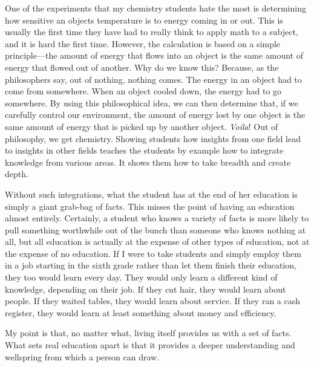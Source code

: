 \documentclass[letterpaper]{article}
\begin{document}
{\color{black}
One of the experiments that my chemistry students hate the most is
determining how sensitive an object{\textquotesingle}s temperature is
to energy coming in or out. This is usually the first time they have
had to really think to apply math to a subject, and it is hard the
first time. However, the calculation is based on a simple principle—the
amount of energy that flows into an object is the same amount of energy
that flowed out of another. Why do we know this? Because, as the
philosophers say, out of nothing, nothing comes. The energy in an
object had to come from somewhere. When an object cooled down, the
energy had to go somewhere. By using this philosophical idea, we can
then determine that, if we carefully control our environment, the
amount of energy lost by one object is the same amount of energy that
is picked up by another object. \textit{Voila}! Out of philosophy, we
get chemistry. Showing students how insights from one field lead to
insights in other fields teaches the students by example how to
integrate knowledge from various areas. It shows them how to take
breadth and create depth.}

{\color{black}
Without such integrations, what the student has at the end of
\textcolor[rgb]{0.32941177,0.5529412,0.83137256}{her} education is
simply a giant grab-bag of facts. This misses the point of having an
education almost entirely. Certainly, a student who knows a variety of
facts is more likely to pull something worthwhile out of
\textcolor[rgb]{0.32941177,0.5529412,0.83137256}{the bunch} than
someone who knows nothing at all, but all education is actually at the
expense of other types of education, not at the expense of no
education. If I were to take students and simply employ them in a job
starting in the sixth grade rather than let them finish their
education, they too
\textcolor[rgb]{0.32941177,0.5529412,0.83137256}{would} learn every
day. They would only learn a different kind of knowledge, depending on
their job. If they cut hair, they would learn about people. If they
waited tables, they would learn about service. If they ran a cash
register, they would learn at least something about money and
efficiency. }

{\color{black}
My point is that, no matter what, living itself provides us with a set
of facts. What sets real education apart is that it provides a deeper
understanding and wellspring from which a person can draw.}
\end{document}
